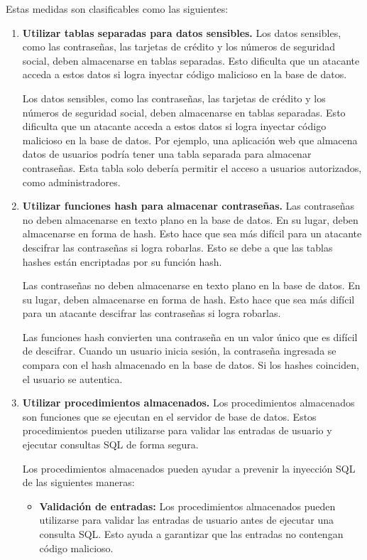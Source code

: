 \documentclass[11pt]{report}
\begin{document}
Estas medidas son clasificables como las siguientes:
\begin{enumerate}
  \item \textbf{Utilizar tablas separadas para datos sensibles.} Los datos sensibles, como las contraseñas, las tarjetas
  de crédito y los números de seguridad social, deben almacenarse en tablas separadas. Esto dificulta que un atacante 
  acceda a estos datos si logra inyectar código malicioso en la base de datos.

  Los datos sensibles, como las contraseñas, las tarjetas de crédito y los números de seguridad social, deben almacenarse
  en tablas separadas. Esto dificulta que un atacante acceda a estos datos si logra inyectar código malicioso en la base
  de datos. Por ejemplo, una aplicación web que almacena datos de usuarios podría tener una tabla separada para almacenar
  contraseñas. Esta tabla solo debería permitir el acceso a usuarios autorizados, como administradores.
  
  \item \textbf{Utilizar funciones hash para almacenar contraseñas.} Las contraseñas no deben almacenarse en texto plano en
  la base de datos. En su lugar, deben almacenarse en forma de hash. Esto hace que sea más difícil para un atacante descifrar
  las contraseñas si logra robarlas. Esto se debe a que las tablas hashes están encriptadas por su función hash.

  Las contraseñas no deben almacenarse en texto plano en la base de datos. En su lugar, deben almacenarse en forma de hash.
  Esto hace que sea más difícil para un atacante descifrar las contraseñas si logra robarlas.
  
  Las funciones hash convierten una contraseña en un valor único que es difícil de descifrar. Cuando un usuario inicia sesión,
  la contraseña ingresada se compara con el hash almacenado en la base de datos. Si los hashes coinciden, el usuario se autentica.
  
  \item \textbf{Utilizar procedimientos almacenados.} Los procedimientos almacenados son funciones que se ejecutan en el servidor
  de base de datos. Estos procedimientos pueden utilizarse para validar las entradas de usuario y ejecutar consultas SQL de forma segura.
  
  Los procedimientos almacenados pueden ayudar a prevenir la inyección SQL de las siguientes maneras:
  \begin{itemize}
    \item \textbf{Validación de entradas:} Los procedimientos almacenados pueden utilizarse para validar las entradas de usuario antes de
    ejecutar una consulta SQL. Esto ayuda a garantizar que las entradas no contengan código malicioso.
    

\end{itemize}
\end{enumerate}
\end{document}
